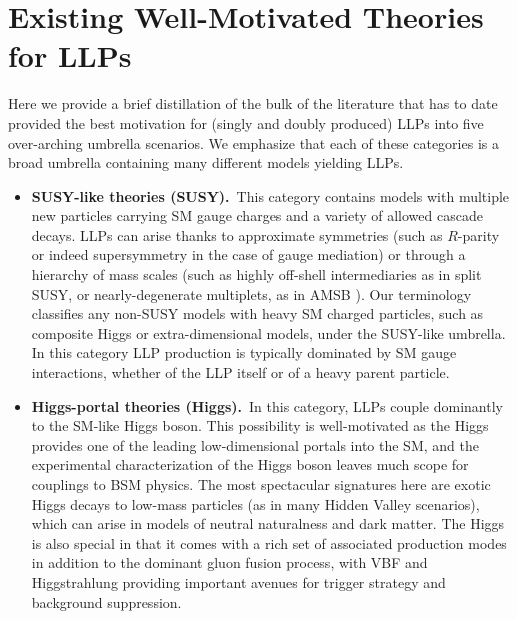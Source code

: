 
\section{Existing Well-Motivated Theories for LLPs}\label{sec:motivated_theories}

Here we provide a brief distillation of the bulk of the literature that has to date provided the best motivation for (singly and doubly produced) LLPs into five over-arching umbrella scenarios.  We emphasize that each of these categories is a broad umbrella containing many different models yielding LLPs.
%
\begin{itemize}

\item {\bf SUSY-like theories (SUSY).}~This category contains models
  with multiple new particles carrying SM gauge charges and a variety
  of allowed cascade decays. LLPs can arise thanks to approximate
  symmetries (such as $R$-parity or indeed supersymmetry in the case
  of gauge mediation) or through a hierarchy of mass scales (such as
  highly off-shell intermediaries as in split SUSY, or
  nearly-degenerate multiplets, as in AMSB ).  Our terminology
  classifies any non-SUSY models with heavy SM charged particles, such
  as composite Higgs or extra-dimensional models, under the SUSY-like
  umbrella.  In this category LLP production is typically dominated by
  SM gauge interactions, whether of the LLP itself or of a heavy
  parent particle.

\item {\bf Higgs-portal theories (Higgs).}~In this category, LLPs couple dominantly to the SM-like Higgs boson.  This possibility is well-motivated as the Higgs provides one of the leading low-dimensional portals into the SM, and the experimental characterization of the Higgs boson leaves much scope for couplings to BSM physics.  The most spectacular signatures here are exotic Higgs decays to low-mass particles  (as in many Hidden Valley scenarios), which can arise in models of neutral naturalness and dark matter.  
The Higgs is also special in that it comes with a rich set of associated production modes in addition to the dominant gluon fusion process, with VBF and Higgstrahlung providing important avenues for trigger strategy and background suppression.


\end{itemize}
